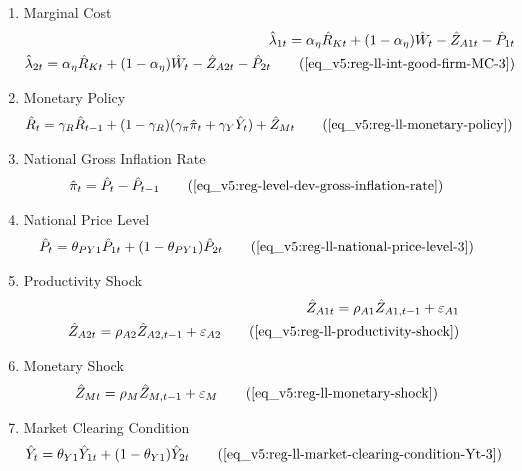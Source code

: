 \documentclass[../thesis.tex]{subfiles}
\begin{document}
{\begin{enumerate}

		
		\item Marginal Cost
		\begin{alignat}{2}
			\hat{\lambda}_{1 t} = {\alpha_{\eta}} \hat{R}_{Kt} + (1- {\alpha_{\eta}}) \hat{W}_{t} - \hat{Z}_{A1 t} - \hat{P}_{1 t} \nonumber \\
			\hat{\lambda}_{2 t} = {\alpha_{\eta}} \hat{R}_{Kt} + (1- {\alpha_{\eta}}) \hat{W}_{t} - \hat{Z}_{A2 t} - \hat{P}_{2 t} \tag{\ref{eq_v5:reg-ll-int-good-firm-MC-3}}
		\end{alignat}
		
		\item Monetary Policy
		\begin{align}
			& \hat{R}_t = \gamma_R \hat{R}_{t-1} + (1-\gamma_R)(\gamma_\pi \hat{\pi}_t + \gamma_Y \hat{Y}_t) + \hat{Z}_{Mt} \tag{\ref{eq_v5:reg-ll-monetary-policy}}
		\end{align}
		
		\item National Gross Inflation Rate
		\begin{align}
			\hat{\pi}_{t} &= \hat{P}_{t} - \hat{P}_{t-1} \tag{\ref{eq_v5:reg-level-dev-gross-inflation-rate}}
		\end{align}
		
		\item National Price Level
		\begin{alignat}{2}
			\hat{P}_{t} &= \theta_{PY1} \hat{P}_{1t} + (1-\theta_{PY1}) \hat{P}_{2t} \tag{\ref{eq_v5:reg-ll-national-price-level-3}}
		\end{alignat}
		
		\item Productivity Shock
		\begin{alignat}{2}
			\hat{Z}_{A1 t} = \rho_{A1} \hat{Z}_{A1, t-1} + \varepsilon_{A1} \nonumber \\
			\hat{Z}_{A2 t} = \rho_{A2} \hat{Z}_{A2, t-1} + \varepsilon_{A2} \tag{\ref{eq_v5:reg-ll-productivity-shock}}
		\end{alignat}
		
		\item Monetary Shock
		\begin{alignat}{2}
			\hat{Z}_{Mt} &= \rho_M \hat{Z}_{M,t-1} + \varepsilon_{M} \tag{\ref{eq_v5:reg-ll-monetary-shock}}
		\end{alignat}
		
		\item Market Clearing Condition
		\begin{align}
			\hat{Y}_{t} &= \theta_{Y1} \hat{Y}_{1t} + (1-\theta_{Y1}) \hat{Y}_{2t} \tag{\ref{eq_v5:reg-ll-market-clearing-condition-Yt-3}}
		\end{align}
		

\end{enumerate}}
\end{document}
